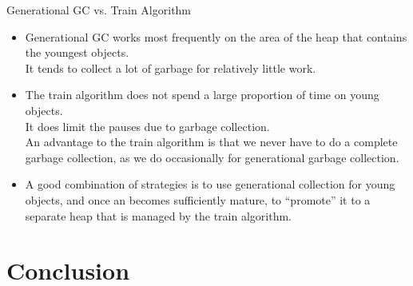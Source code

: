 \begin{bibunit}[apalike]
\begin{frame}{Generational GC vs. Train Algorithm}
	\begin{itemize}
	\item Generational GC works most frequently on the area of the heap that contains the youngest objects. \\
		It tends to collect a lot of garbage for relatively little work.
	\vfill
	\item The train algorithm does not spend a large proportion of time on young objects. \\
		It does limit the pauses due to garbage collection. \\
		An advantage to the train algorithm is that we never have to do a complete garbage collection, as we do occasionally for generational garbage collection.
	\vfill
	\item A good combination of strategies is to use generational collection  for young objects, and once an becomes sufficiently mature, to ``promote'' it to a separate heap that is managed by the train algorithm.
	\end{itemize}
\end{frame}

\section{Conclusion}

\tableofcontentslide[sectionstyle={show/shaded},subsectionstyle={hide/hide/hide},subsubsectionstyle={hide/hide/hide/hide}]


\end{bibunit}
